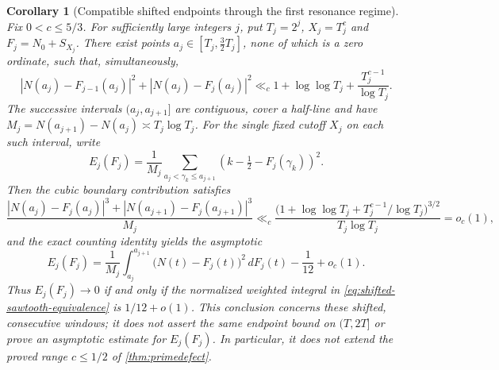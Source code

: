 \documentclass[11pt,reqno]{amsart}
\numberwithin{equation}{section}
\newtheorem{corollary}[theorem]{Corollary}
\begin{document}
\begin{corollary}[Compatible shifted endpoints through the first resonance regime]
\label{cor:long-cutoff-shifted-endpoints}
Fix $0<c\le5/3$. For sufficiently large integers $j$, put
$T_j=2^j$, $X_j=T_j^c$ and $F_j=N_0+S_{X_j}$.
There exist points $a_j\in[T_j,\tfrac32T_j]$, none of
which is a zero ordinate, such that, simultaneously,
\begin{equation}\label{eq:compatible-endpoints}
 |N(a_j)-F_{j-1}(a_j)|^2
 +|N(a_j)-F_j(a_j)|^2
 \ll_c 1+\log\log T_j+
          \frac{T_j^{c-1}}{\log T_j}.
\end{equation}
The successive intervals $(a_j,a_{j+1}]$ are contiguous,
cover a half-line and have
$M_j=N(a_{j+1})-N(a_j)\asymp T_j\log T_j$.
For the \emph{single fixed cutoff $X_j$ on each such interval},
write
\[
 E_j(F_j)=\frac1{M_j}\sum_{a_j<\gamma_k\le a_{j+1}}
           \left(k-\tfrac12-F_j(\gamma_k)\right)^2.
\]
Then the cubic boundary contribution satisfies
\begin{equation}\label{eq:shifted-cubic-bound}
 \frac{|N(a_j)-F_j(a_j)|^3+
       |N(a_{j+1})-F_j(a_{j+1})|^3}{M_j}
 \ll_c\frac{\bigl(1+\log\log T_j+
                  T_j^{c-1}/\log T_j\bigr)^{3/2}}
                {T_j\log T_j}=o_c(1),
\end{equation}
and the exact counting identity yields the asymptotic
\begin{equation}\label{eq:shifted-sawtooth-equivalence}
 E_j(F_j)=\frac1{M_j}\int_{a_j}^{a_{j+1}}
               \bigl(N(t)-F_j(t)\bigr)^2\,dF_j(t)
               -\frac1{12}+o_c(1).
\end{equation}
Thus $E_j(F_j)\to0$ if and only if the normalized
weighted integral in \eqref{eq:shifted-sawtooth-equivalence}
is $1/12+o(1)$.
This conclusion concerns these \emph{shifted, consecutive
windows}; it does not assert the same endpoint bound on
$(T,2T]$ or prove an asymptotic estimate for $E_j(F_j)$.
In particular, it does not extend the proved range $c\le1/2$
of \cref{thm:primedefect}.
\end{corollary}
\end{document}
